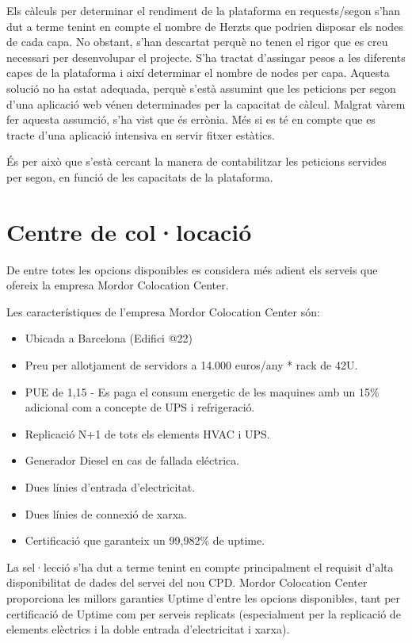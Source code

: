 \documentclass[a4paper, 11pt]{article}
\begin{document}
Els càlculs per determinar el rendiment de la plataforma en requests/segon s'han dut a terme tenint en compte el nombre de Herzts que podrien disposar els nodes de cada capa. No obstant, s'han descartat perquè no tenen el rigor que es creu necessari per desenvolupar el projecte. 
S'ha tractat d'assingar pesos a les diferents capes de la plataforma i així determinar el nombre de nodes per capa. Aquesta solució no ha estat adequada, perquè s'està assumint que les peticions per segon d'una aplicació web vénen determinades per la capacitat de càlcul. Malgrat vàrem fer aquesta assumció, s'ha vist que és errònia. Més si es té en compte que es tracte d'una aplicació intensiva en servir fitxer estàtics.

És per això que s'està cercant la manera de contabilitzar les peticions servides per segon, en funció de les capacitats de la plataforma.

\section{Centre de col·locació}

De entre totes les opcions disponibles es considera més adient els serveis que ofereix la empresa Mordor Colocation Center. 

Les característiques de l’empresa Mordor Colocation Center són:

\begin{itemize}
\item Ubicada a Barcelona (Edifici @22)
\item Preu per allotjament de servidors a 14.000 euros/any * rack de 42U.
\item PUE de 1,15 - Es paga el consum energetic de les maquines amb un 15\% adicional com a concepte de UPS i refrigeració.
\item Replicació N+1 de tots els elements HVAC i UPS.
\item Generador Diesel en cas de fallada eléctrica.
\item Dues línies d’entrada d’electricitat.
\item Dues línies de connexió de xarxa.
\item Certificació que garanteix un 99,982\% de uptime.
\end{itemize}

La sel·lecció s’ha dut a terme tenint en compte principalment el requisit d’alta disponibilitat de dades del servei del nou CPD. Mordor Colocation Center proporciona les millors garanties Uptime d’entre les opcions disponibles, tant per certificació de Uptime com per serveis replicats (especialment per la replicació de elements elèctrics i la doble entrada d’electricitat i xarxa).
\end{document}
